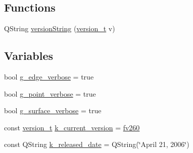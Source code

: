 \subsection*{Functions}
\begin{DoxyCompactItemize}
\item 
Q\-String \hyperlink{namespaceShipCADGeometry_abf7a88cfd0a107473fb677cc9d7d7043}{version\-String} (\hyperlink{namespaceShipCADGeometry_aa8b61644e46115e9d63667f213045e97}{version\-\_\-t} v)
\end{DoxyCompactItemize}
\subsection*{Variables}
\begin{DoxyCompactItemize}
\item 
bool \hyperlink{namespaceShipCADGeometry_a7292a1f721ae22250d2cce1f1d8c1b6e}{g\-\_\-edge\-\_\-verbose} = true
\item 
bool \hyperlink{namespaceShipCADGeometry_ac9b4ad824e0afa8d19c8a11f3947804d}{g\-\_\-point\-\_\-verbose} = true
\item 
bool \hyperlink{namespaceShipCADGeometry_a8582b9000c1e02427db76565fdd88e4b}{g\-\_\-surface\-\_\-verbose} = true
\item 
const \hyperlink{namespaceShipCADGeometry_aa8b61644e46115e9d63667f213045e97}{version\-\_\-t} \hyperlink{namespaceShipCADGeometry_a5c748cd8606fd73ee683752564c7cb8a}{k\-\_\-current\-\_\-version} = \hyperlink{namespaceShipCADGeometry_aa8b61644e46115e9d63667f213045e97ad54644a9ccd5a642b7527881e9b2149b}{fv260}
\item 
const Q\-String \hyperlink{namespaceShipCADGeometry_a2ce14e07ed70bf203837e5b08635731e}{k\-\_\-released\-\_\-date} = Q\-String(\char`\"{}April 21, 2006\char`\"{})
\end{DoxyCompactItemize}


